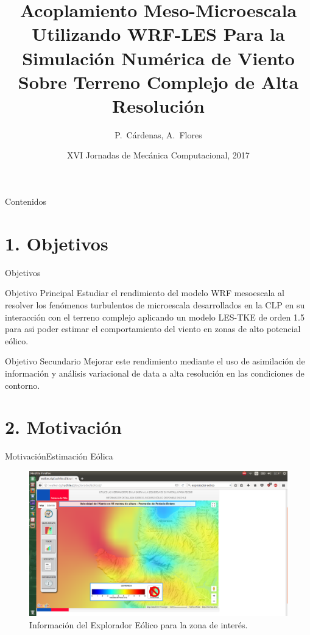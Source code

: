 \documentclass[mathserif]{beamer}
\title{Acoplamiento Meso-Microescala Utilizando WRF-LES Para la Simulación Numérica de Viento Sobre Terreno Complejo de Alta Resolución}
\author{P.~Cárdenas, A.~Flores}
\institute[Universidad Técnica Federico Santa María]
{%
  Departamento de Ing. Mecánica\\
  Universidad Técnica Federico Santa María}
\date{XVI Jornadas de Mecánica Computacional, 2017}
\begin{document}
\begin{frame}
  \titlepage
\end{frame}

\begin{frame}{Contenidos}
	\tableofcontents
\end{frame}

\section{1. Objetivos}
\begin{frame}{Objetivos}
	\begin{block}{Objetivo Principal}\justifying
	   	Estudiar el rendimiento del modelo WRF mesoescala al resolver los fenómenos turbulentos de microescala desarrollados en la CLP en su interacción con el terreno complejo aplicando un modelo LES-TKE de orden 1.5 para asi poder estimar el comportamiento del viento en zonas de alto potencial eólico.
	\end{block}
	\begin{block}{Objetivo Secundario}\justifying
		Mejorar este rendimiento mediante el uso de asimilación de información y análisis variacional de data a alta resolución en las condiciones de contorno.
	\end{block}
\end{frame}

\section{2. Motivación}
\begin{frame}{Motivación}{Estimación Eólica}
	\begin{figure}[H]
		\centering
		\includegraphics[width=0.9\linewidth,trim={5.4cm 2cm 15cm 5.5cm},clip]{explorador}
		\caption{Información del Explorador Eólico para la zona de interés.}
		\label{fig:explorador}
	\end{figure}
\end{frame}
\end{document}
